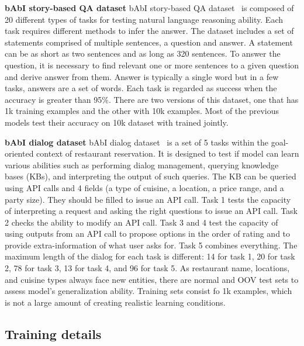 \documentclass{article} \usepackage{iclr2018_conference,times}
\begin{document}
\textbf{bAbI story-based QA dataset} \quad 
bAbI story-based QA dataset~\citep{Weston2015towards} is composed of 20 different types of tasks for testing natural language reasoning ability.
Each task requires different methods to infer the answer.
The dataset includes a set of statements comprised of multiple sentences, a question and answer.
A statement can be as short as two sentences and as long as 320 sentences.
To answer the question, it is necessary to find relevant one or more sentences to a given question and derive answer from them.
Answer is typically a single word but in a few tasks, answers are a set of words.  
Each task is regarded as success when the accuracy is greater than 95\%.
There are two versions of this dataset, one that has 1k training examples and the other with 10k examples.
Most of the previous models test their accuracy on 10k dataset with trained jointly.

\textbf{bAbI dialog dataset} \quad 
bAbI dialog dataset~\citep{Bordes16} is a set of 5 tasks within the goal-oriented context of restaurant reservation. 
It is designed to test if model can learn various abilities such as performing dialog management, querying knowledge bases (KBs), and interpreting the output of such queries. 
The KB can be queried using API calls and 4 fields (a type of cuisine, a location, a price range, and a party size).
They should be filled to issue an API call.
Task 1 tests the capacity of interpreting a request and asking the right questions to issue an API call.
Task 2 checks the ability to modify an API call.
Task 3 and 4 test the capacity of using outputs from an API call to propose options in the order of rating and to provide extra-information of what user asks for.
Task 5 combines everything. 
The maximum length of the dialog for each task is different: 14 for task 1, 20 for task 2, 78 for task 3, 13 for task 4, and 96 for task 5.
As restaurant name, locations, and cuisine types always face new entities, there are normal and OOV test sets to assess model's generalization ability. 
Training sets consist fo 1k examples, which is not a large amount of creating realistic learning conditions.




\subsection{Training details}
\end{document}
